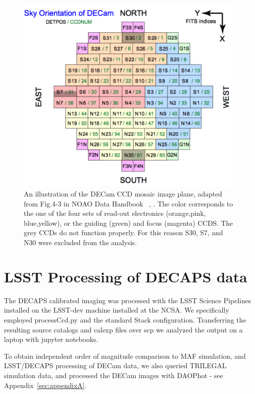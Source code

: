 \documentclass[DM,lsstdraft,toc,usenatbib]{lsstdoc}
\begin{document}
\begin{figure}
\includegraphics[width=1.0\columnwidth]{figs/05_Fig_4_3_NOAO_DECam_ccd_mosaic.png}
\caption{An illustration of the DECam CCD mosaic image plane, adapted from Fig.4-3 in NOAO Data Handbook ~\citep{shaw2015}, . The color corresponds to the one of the four sets of read-out electronics (orange,pink, blue,yellow), or the guiding (green) and focus (magenta) CCDS.  The grey CCDs do not function properly. For this reason  S30, S7, and N30 were excluded from the analysis. }
\label{fig:decam_mosaic_ccd}
\end{figure} 


\section{LSST Processing of DECAPS data}
\label{sec:LSST}
The DECAPS calibrated imaging was processed with the LSST Science Pipelines installed on the LSST-dev machine installed at the NCSA.  We specifically employed processCcd.py and the standard Stack configuration. Transferring the resulting source catalogs and calexp files over scp we analyzed the output on a laptop with jupyter notebooks. 


To obtain independent order of magnitude comparison to MAF simulation, and LSST/DECAPS processing of DECam data, we also queried TRILEGAL simulation data, and processed the DECam images  with DAOPhot - see Appendix~\ref{sec:appendixA}. 
\end{document}
